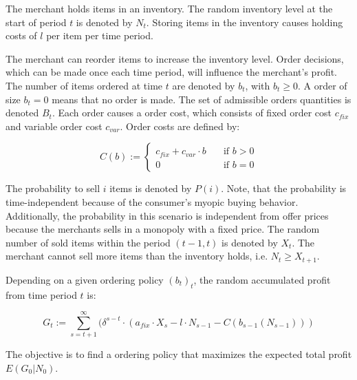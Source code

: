 The merchant holds items in an inventory.
The random inventory level at the start of period $t$ is denoted by $N_t$.
Storing items in the inventory causes holding costs of $l$ per item per time period. %

The merchant can reorder items to increase the inventory level.
Order decisions, which can be made once each time period, will influence the merchant's profit.
The number of items ordered at time $t$ are denoted by $b_t$, with $b_t \geq 0$.
A order of size $b_t = 0$ means that no order is made.
The set of admissible orders quantities is denoted $B_t$.
Each order causes a order cost, which consists of fixed order cost $c_{fix}$ and variable order cost $c_{var}$.
Order costs are defined by:

\begin{equation}
\label{eq:order_cost}
C(b) := \begin{cases}
	c_{fix} + c_{var} \cdot b  & \quad \text{if } b > 0 \\
	0  & \quad \text{if } b = 0
\end{cases}
\end{equation}

The probability to sell $i$ items is denoted by $P(i)$.
Note, that the probability is time-independent because of the consumer's myopic buying behavior.
Additionally, the probability in this scenario is independent from offer prices because the merchants sells in a monopoly with a fixed price.
The random number of sold items within the period $(t-1, t)$ is denoted by $X_t$.
The merchant cannot sell more items than the inventory holds, i.e. $N_t \geq X_{t+1}$. %

Depending on a given ordering policy $(b_t)_t$, the random accumulated profit from time period $t$ is:

$$
G_t := \sum_{s=t+1}^{\infty} (\delta^{s-t} \cdot (a_{fix} \cdot X_s - l \cdot N_{s-1} - C(b_{s-1}(N_{s-1})))
$$

The objective is to find a ordering policy that maximizes the expected total profit $E(G_0 | N_0)$.


